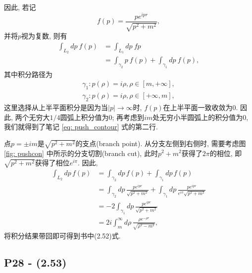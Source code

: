 因此, 若记
\begin{equation}
  f(p) = \frac{pe^{ipr}}{\sqrt{p^2+m^2}},
\end{equation}
并将$p$视为复数, 则有
\begin{equation}\label{eq: push_contour}
  \begin{aligned}
    \int_{L_2}dp\ f(p) & = \int_{L_1}dp\ fp                                  \\
                       & = \int_{\gamma_2}p\ f(p) + \int_{\gamma_1}dp\ f(p),
  \end{aligned}
\end{equation}
其中积分路径为
\begin{equation*}
  \begin{aligned}
    \gamma_1: p(\rho) = i\rho, \rho\in[m,+\infty], \\
    \gamma_2: p(\rho) = i\rho, \rho\in[+\infty,m],
  \end{aligned}
\end{equation*}
这里选择从上半平面积分是因为当$|p|\to\infty$时, $f(p)$在上半平面一致收敛为0.
因此, 两个无穷大$1/4$圆弧上积分值为0; 再考虑到$im$处无穷小半圆弧上的积分值为0, 我们就得到了笔记 \eqref{eq: push_contour} 式的第二行.

点$p = \pm im$是$\sqrt{p^2+m^2}$的支点(branch point).
从分支左侧到右侧时, 需要考虑图 \ref{fig: pushcon} 中所示的分支切割(branch cut), 此时$p^2+m^2$获得了$2\pi$的相位, 即$\sqrt{p^2+m^2}$获得了相位$e^{i\pi}$.
因此,
\begin{equation}
  \begin{aligned}
    \int_{L_2}dp\,f(p) & = \int_{\gamma_2}dp\,f(p) + \int_{\gamma_1}dp\,f(p)                     \\
                       & = \int_{\gamma_2}dp\,\frac{pe^{ipr}}{\sqrt{p^2+m^2}}
    + \int_{\gamma_1}dp\,\frac{pe^{ipr}}{e^{i\pi}\sqrt{p^2+m^2}}                                 \\
                       & = -2\int_{\gamma_1}dp\,\frac{pe^{ipr}}{\sqrt{p^2+m^2}}                  \\
                       & = 2i\int_{m}^{\infty}d\rho\,\frac{\rho e^{-\rho r}}{\sqrt{\rho^2-m^2}},
  \end{aligned}
\end{equation}
将积分结果带回即可得到书中(2.52)式.

\subsection{P28 - (2.53)}

